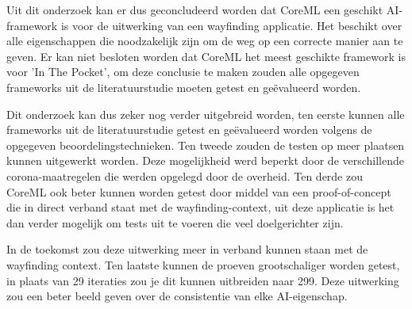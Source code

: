 
Uit dit onderzoek kan er dus geconcludeerd worden dat CoreML een geschikt AI-framework is voor de uitwerking van een wayfinding applicatie. Het beschikt over alle eigenschappen die noodzakelijk zijn om de weg op een correcte manier aan te geven. Er kan niet besloten worden dat CoreML het meest geschikte framework is voor 'In The Pocket', om deze conclusie te maken zouden alle opgegeven frameworks uit de literatuurstudie moeten getest en geëvalueerd worden.

Dit onderzoek kan dus zeker nog verder uitgebreid worden, ten eerste kunnen alle frameworks uit de literatuurstudie getest en geëvalueerd worden volgens de opgegeven beoordelingstechnieken. Ten tweede zouden de testen op meer plaatsen kunnen uitgewerkt worden. Deze mogelijkheid werd beperkt door de verschillende corona-maatregelen die werden opgelegd door de overheid. Ten derde zou CoreML ook beter kunnen worden getest door middel van een proof-of-concept die in direct verband staat met de wayfinding-context, uit deze applicatie is het dan verder mogelijk om tests uit te voeren die veel doelgerichter zijn.

In de toekomst zou deze uitwerking meer in verband kunnen staan met de wayfinding context. Ten laatste kunnen de proeven grootschaliger worden getest, in plaats van 29 iteraties zou je dit kunnen uitbreiden naar 299. Deze uitwerking zou een beter beeld geven over de consistentie van elke AI-eigenschap.